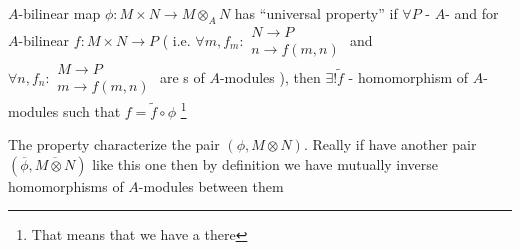 \begin{definition}
  $A$-bilinear map $\phi: M \times N \to M \otimes_A N$ has
  ``universal property'' if
  $\forall P$ - $A$- and
  for $A$-bilinear $f: M \times N \to P$ (
  i.e.
  \(
  \forall m, f_m:
  \begin{array}{c}
    N \to P \\
    n \to f(m,n)
    \end{array}
  \)
  and
  \(
  \forall n, f_n:
  \begin{array}{c}
    M \to P \\
    m \to f(m,n)
    \end{array}
  \)
  are s of $A$-modules
  ), then
  $\exists! \tilde{f}$ - homomorphism of $A$-modules such that
  $f = \tilde{f} \circ \phi$
  \footnote{
    That means that we have a  there
  }

  \label{def:universalproperty}
\end{definition}

The property characterize the pair
$\left(\phi, M \otimes N\right)$.
Really if have another pair
$\left(\overline{\phi}, \overline{M \otimes N}\right)$
like this one then by definition we have mutually inverse
homomorphisms of $A$-modules between them

